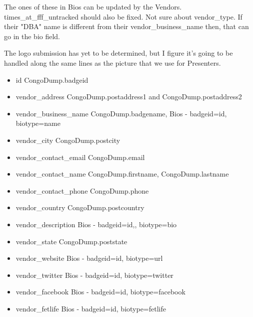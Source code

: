 \documentclass[captions=tablesignature]{scrartcl}
\begin{document}
The ones of these in Bios can be updated by the
Vendors. times\_at\_fff\_untracked should also be fixed.  Not sure
about vendor\_type.  If their "DBA" name is different from their
vendor\_business\_name then, that can go in the bio field.

The logo submission has yet to be determined, but I figure it's
going to be handled along the same lines as the picture that we
use for Presenters.
\begin{itemize}
\item id
\label{sec-2-1-1}
CongoDump.badgeid

\item vendor\_address
\label{sec-2-1-2}
CongoDump.postaddress1 and CongoDump.postaddress2

\item vendor\_business\_name
\label{sec-2-1-3}
CongoDump.badgename, Bios - badgeid=id, biotype=name

\item vendor\_city
\label{sec-2-1-4}
CongoDump.postcity

\item vendor\_contact\_email
\label{sec-2-1-5}
CongoDump.email

\item vendor\_contact\_name
\label{sec-2-1-6}
CongoDump.firstname, CongoDump.lastname

\item vendor\_contact\_phone
\label{sec-2-1-7}
CongoDump.phone

\item vendor\_country
\label{sec-2-1-8}
CongoDump.postcountry

\item vendor\_description
\label{sec-2-1-9}
Bios - badgeid=id,, biotype=bio 

\item vendor\_state
\label{sec-2-1-10}
CongoDump.poststate

\item vendor\_website
\label{sec-2-1-11}
Bios - badgeid=id, biotype=url

\item vendor\_twitter
\label{sec-2-1-12}
Bios - badgeid=id, biotype=twitter

\item vendor\_facebook
\label{sec-2-1-13}
Bios - badgeid=id, biotype=facebook

\item vendor\_fetlife
\label{sec-2-1-14}
Bios - badgeid=id, biotype=fetlife


\end{itemize}
\end{document}
